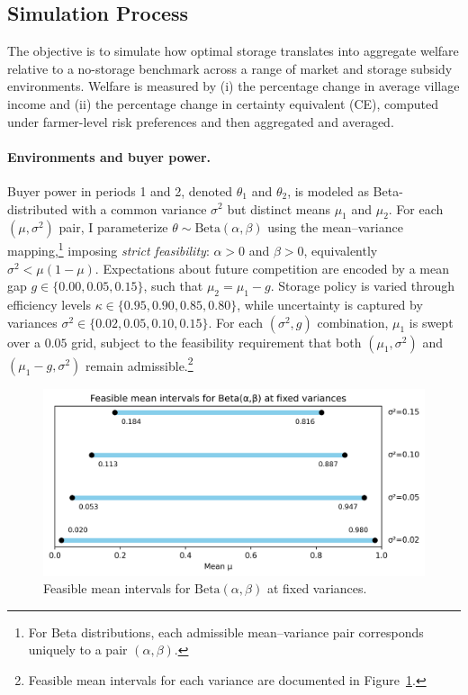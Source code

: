 \subsection{Simulation Process}
The objective is to simulate how optimal storage translates into aggregate welfare relative to a no-storage benchmark across a range of market and storage subsidy environments. Welfare is measured by (i) the percentage change in average village income and (ii) the percentage change in certainty equivalent (CE), computed under farmer-level risk preferences and then aggregated and averaged.

\paragraph{Environments and buyer power.}
Buyer power in periods 1 and 2, denoted $\theta_1$ and $\theta_2$, is modeled as Beta-distributed with a common variance $\sigma^2$ but distinct means $\mu_1$ and $\mu_2$. For each $(\mu,\sigma^2)$ pair, I parameterize $\theta\sim\text{Beta}(\alpha,\beta)$ using the mean–variance mapping,\footnote{For Beta distributions, each admissible mean–variance pair corresponds uniquely to a pair $(\alpha,\beta)$.} imposing \emph{strict feasibility}: $\alpha>0$ and $\beta>0$, equivalently $\sigma^2<\mu(1-\mu)$. Expectations about future competition are encoded by a mean gap $g\in\{0.00,0.05,0.15\}$, such that $\mu_2=\mu_1-g$. Storage policy is varied through efficiency levels $\kappa\in\{0.95,0.90,0.85,0.80\}$, while uncertainty is captured by variances $\sigma^2\in\{0.02,0.05,0.10,0.15\}$. For each $(\sigma^2,g)$ combination, $\mu_1$ is swept over a $0.05$ grid, subject to the feasibility requirement that both $(\mu_1,\sigma^2)$ and $(\mu_1-g,\sigma^2)$ remain admissible.\footnote{Feasible mean intervals for each variance are documented in Figure~\ref{fig:parameter_range_Beta_distribution}.}

\begin{figure}[ht!]
    \centering
    \includegraphics[width=0.90\linewidth]{model_figures/parameter_range_Beta_distribution.png}
    \caption{Feasible mean intervals for $\text{Beta}(\alpha,\beta)$ at fixed variances.}
    \label{fig:parameter_range_Beta_distribution}
\end{figure}

